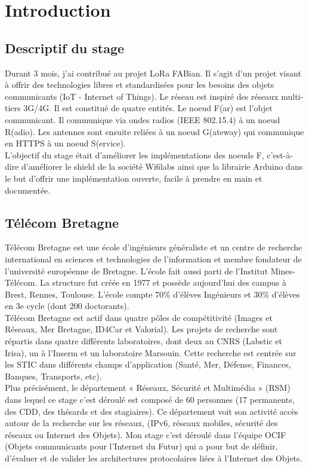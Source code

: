 \documentclass{article}
\begin{document}
\thispagestyle{empty}
\tableofcontents
\listoffigures
\newpage
\setcounter{page}{1}

\section{Introduction}
\subsection{Descriptif du stage}
Durant 3 mois, j'ai contribué au projet LoRa FABian. Il s'agit d'un projet visant à offrir des technologies libres et standardisées pour les besoins des objets communicants (IoT - Internet of Things). Le réseau est inspiré des réseaux multi-tiers 3G/4G. Il est constitué de quatre entités. Le noeud F(ar) est l'objet communicant. Il communique via ondes radios (IEEE 802.15.4) à un noeud R(adio). Les antennes sont ensuite reliées à un noeud G(ateway) qui communique en HTTPS à un noeud S(ervice).\\
L'objectif du stage était d'améliorer les implémentations des noeuds F, c'est-à-dire d'améliorer le shield de la société Wi6labs ainsi que la librairie Arduino dans le but d'offrir une implémentation ouverte, facile à prendre en main et documentée.
\subsection{Télécom Bretagne}
Télécom Bretagne est une école d'ingénieurs généraliste et un centre de recherche international en sciences et technologies de l'information et membre fondateur de l'université européenne de Bretagne. L'école fait aussi parti de l'Institut Mines-Télécom. La structure fut créée en 1977 et possède aujourd'hui des campus à Brest, Rennes, Toulouse. L'école compte 70\% d'élèves Ingénieurs et 30\% d'élèves en 3e cycle (dont 200 doctorants).\\
Télécom Bretagne est actif dans quatre pôles de compétitivité (Images et Réseaux, Mer Bretagne, ID4Car et Valorial). Les projets de recherche sont répartis dans quatre différents laboratoires, dont deux au CNRS (Labstic et Irisa), un à l'Inserm et un laboratoire Marsouin. Cette recherche est centrée sur les STIC dans différents champs d'application (Santé, Mer, Défense, Finances, Banques, Transports, etc).\\
Plus précisément, le département « Réseaux, Sécurité et Multimédia » (RSM) dans lequel ce stage c'est déroulé est composé de 60 personnes (17 permanents, des CDD, des thésards et des stagiaires). Ce département voit son activité accès autour de la recherche sur les réseaux, (IPv6, réseaux mobiles, sécurité des réseaux ou Internet des Objets). Mon stage c'est déroulé dans l'équipe OCIF (Objets communicants pour l'Internet du Futur) qui a pour but de définir, d’évaluer et de valider les architectures protocolaires liées à l’Internet des Objets.
\end{document}
